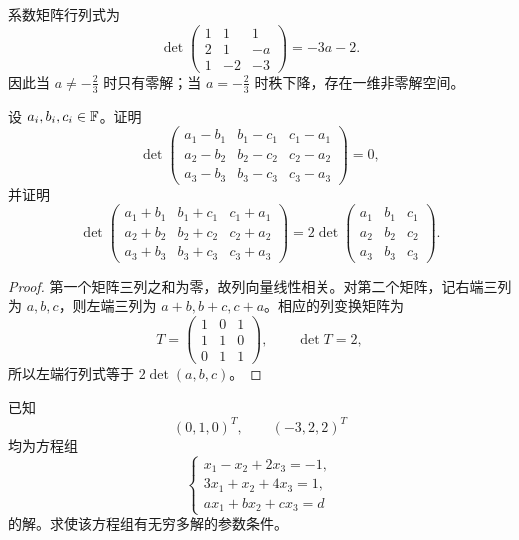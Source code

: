 \begin{solution}
系数矩阵行列式为
\begin{equation}
 \det\begin{pmatrix}
 1&1&1\\
 2&1&-a\\
 1&-2&-3
 \end{pmatrix}
 =-3a-2.
\end{equation}
因此当 $a\neq-\frac23$ 时只有零解；当 $a=-\frac23$ 时秩下降，存在一维非零解空间。
\end{solution}

\begin{exercise}[两个行列式恒等式]
设 $a_i,b_i,c_i\in\mathbb F$。证明
\begin{equation}
 \det\begin{pmatrix}
 a_1-b_1&b_1-c_1&c_1-a_1\\
 a_2-b_2&b_2-c_2&c_2-a_2\\
 a_3-b_3&b_3-c_3&c_3-a_3
 \end{pmatrix}=0,
\end{equation}
并证明
\begin{equation}
 \det\begin{pmatrix}
 a_1+b_1&b_1+c_1&c_1+a_1\\
 a_2+b_2&b_2+c_2&c_2+a_2\\
 a_3+b_3&b_3+c_3&c_3+a_3
 \end{pmatrix}
 =2\det\begin{pmatrix}
 a_1&b_1&c_1\\
 a_2&b_2&c_2\\
 a_3&b_3&c_3
 \end{pmatrix}.
\end{equation}
\end{exercise}

\begin{proof}
第一个矩阵三列之和为零，故列向量线性相关。对第二个矩阵，记右端三列为 $a,b,c$，则左端三列为 $a+b,b+c,c+a$。相应的列变换矩阵为
\begin{equation}
 T=\begin{pmatrix}1&0&1\\1&1&0\\0&1&1\end{pmatrix},
 \qquad \det T=2,
\end{equation}
所以左端行列式等于 $2\det(a,b,c)$。
\end{proof}

\begin{exercise}[由两个已知解反推参数]
已知
\begin{equation}
 (0,1,0)^T,
 \qquad (-3,2,2)^T
\end{equation}
均为方程组
\begin{equation}
\begin{cases}
 x_1-x_2+2x_3=-1,\\
 3x_1+x_2+4x_3=1,\\
 ax_1+bx_2+cx_3=d
\end{cases}
\end{equation}
的解。求使该方程组有无穷多解的参数条件。
\end{exercise}

